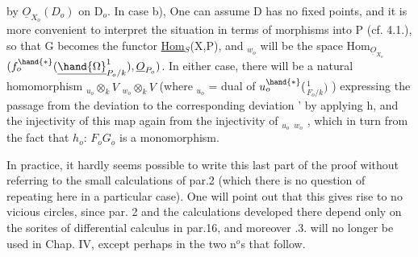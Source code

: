 
by $\underline{O}_{X_o}(D_o)$ on D$_o$. In case b), One can assume D has no fixed
points, and it is more convenient to interpret the situation in terms of
morphisms into P (cf. 4.1.), so that G becomes the functor
\underline{Hom}$_S$(X,P), and $_{w_o}$ will be the space  Hom$_{\underline{O}_{X_o}}$$(f_o^{\hand{*}}(\underline{\hand{\Omega}}^{1}_{P_o/k}), \underline{O}_{P_o})$.
In either case, there will be a natural homomorphism
$_{u_o}\otimes_k V$ \hand{$\to$} $_{w_o}\otimes_k V$ (where $_{u_o}$ = dual of $u_o^{\hand{*}}($\hand{$\Omega$}$^{1}_{F_o/k})$ ) expressing the passage
from the deviation \hand{$\delta$} to the corresponding deviation \hand{$\delta$}' by applying h,
and the injectivity of this map  again from the injectivity
of $_{u_o}$\hand{$\to$} $_{w_o}$ , which in turn  from the fact that $h_o$: $F_o$\hand{$\to$}$G_o$ is a
monomorphism.

In practice, it hardly seems possible to write this last
part of the proof without referring to the small calculations of par.2
(which there is no question of repeating here in a particular case). One
will point out that this gives rise to no vicious circles, since par.
2  and the calculations  developed there depend only on the sorites
of differential calculus in par.16, and moreover .3. will no longer
be used in Chap. IV, except perhaps in the two n$^{o}$s that follow.

